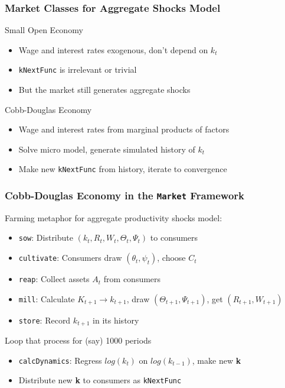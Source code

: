 \documentclass[11pt]{cfpbpresentation}
\begin{document}
\begin{frame}
\frametitle{Market Classes for Aggregate Shocks Model}

\begin{block}{Small Open Economy}
\begin{itemize}
\item Wage and interest rates exogenous, don't depend on $k_t$

\item \texttt{kNextFunc} is irrelevant or trivial

\item But the market still generates aggregate shocks
\end{itemize}
\end{block}

\begin{block}{Cobb-Douglas Economy}
\begin{itemize}
\item Wage and interest rates from marginal products of factors

\item Solve micro model, generate simulated history of $k_t$

\item Make new \texttt{kNextFunc} from history, iterate to convergence
\end{itemize}
\end{block}
\end{frame}



\begin{frame}
\frametitle{Cobb-Douglas Economy in the \texttt{Market} Framework}

Farming metaphor for aggregate productivity shocks model:
\begin{itemize}
\item \texttt{sow}: Distribute $(k_t,R_t,W_t,\Theta_t,\Psi_t)$ to consumers

\item \texttt{cultivate}: Consumers draw $(\theta_t,\psi_t)$, choose $C_t$

\item \texttt{reap}: Collect assets $A_t$ from consumers

\item \texttt{mill}: Calculate $K_{t+1} \rightarrow k_{t+1}$, draw $(\Theta_{t+1},\Psi_{t+1})$, get $(R_{t+1},W_{t+1})$

\item \texttt{store}: Record $k_{t+1}$ in its history
\end{itemize}

Loop that process for (say) 1000 periods
\begin{itemize}
\item \texttt{calcDynamics}: Regress $log(k_t)$ on $log(k_{t-1})$, make new \textbf{k}

\item Distribute new \textbf{k} to consumers as \texttt{kNextFunc}
\end{itemize}
\end{frame}
\end{document}

